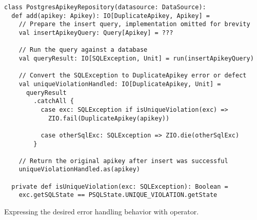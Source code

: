 \begin{algorithm}

\begin{verbatim}
class PostgresApikeyRepository(datasource: DataSource):
  def add(apikey: Apikey): IO[DuplicateApikey, Apikey] =
    // Prepare the insert query, implementation omitted for brevity
    val insertApikeyQuery: Query[Apikey] = ???

    // Run the query against a database
    val queryResult: IO[SQLException, Unit] = run(insertApikeyQuery)

    // Convert the SQLException to DuplicateApikey error or defect
    val uniqueViolationHandled: IO[DuplicateApikey, Unit] =
      queryResult
        .catchAll {
          case exc: SQLException if isUniqueViolation(exc) =>
            ZIO.fail(DuplicateApikey(apikey))

          case otherSqlExc: SQLException => ZIO.die(otherSqlExc)
        }

    // Return the original apikey after insert was successful
    uniqueViolationHandled.as(apikey)

  private def isUniqueViolation(exc: SQLException): Boolean =
    exc.getSQLState == PSQLState.UNIQUE_VIOLATION.getState
\end{verbatim}

\caption{Expressing the desired error handling behavior with  operator. \label{casestudy:converterrors}}
\end{algorithm}